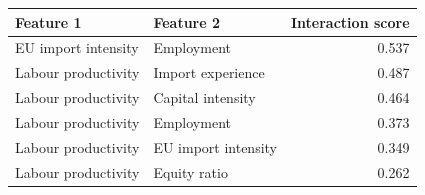 \begin{table}[!ht]
 \label{tab:interaction_strength_v2}
\centering
\begin{tabular}{llr}
\hline
Feature 1 & Feature 2 & Interaction score \\
\hline
EU import intensity & Employment & 0.537 \\
Labour productivity & Import experience & 0.487 \\
Labour productivity & Capital intensity & 0.464 \\
Labour productivity & Employment & 0.373 \\
Labour productivity & EU import intensity & 0.349 \\
Labour productivity & Equity ratio & 0.262 \\
\hline
\end{tabular}
\end{table}
